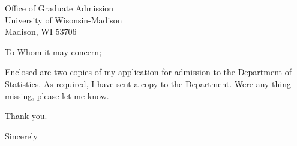 \documentclass[11pt, a4paper]{letter}
\begin{document}
\address{Cheng-Bin Jin \\
Room 525, Hi-Tech Building,\\
INHA University,\\
100 Inha-ro, Michuhol-gu,\\
Incheon 22212, Korea}

\begin{letter}
{Office of Graduate Admission\\
University of Wisonsin-Madison\\
Madison, WI 53706}

\opening{To Whom it may concern;}
Enclosed are two copies of my application for admission to the Department of Statistics. As required, I have sent a copy to the Department. Were any thing missing, please let me know.

Thank you.

\closing{Sincerely}
\end{letter}
\end{document}
